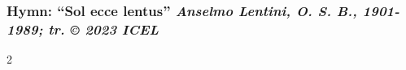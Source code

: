 \subsubsection*{Hymn: ``Sol ecce lentus'' \hfill
{\small\itshape  Anselmo Lentini, O. S. B., 1901-1989; tr.  © 2023 ICEL}}

\begin{multicols*}{2}
    
\end{multicols*}
